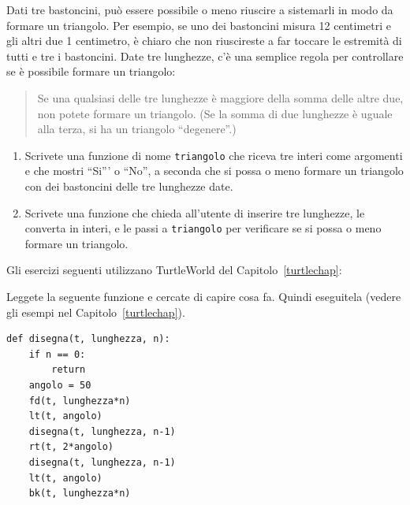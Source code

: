 \documentclass[10pt]{book}
\begin{document}
\vspace{0.2in}
\begin{exercise}

Dati tre bastoncini, può essere possibile o meno riuscire a sistemarli in modo da formare un triangolo. Per esempio, se uno dei bastoncini misura 12 centimetri e gli altri due 1 centimetro, è chiaro che non riuscireste a far toccare le estremità di tutti e tre i bastoncini. Date tre lunghezze, c'è una semplice regola per controllare se è possibile formare un triangolo:

\begin{quotation}
Se una qualsiasi delle tre lunghezze è maggiore della somma delle altre due, non potete formare un triangolo. (Se la somma di due lunghezze è uguale alla terza, si ha un triangolo ``degenere''.)
\end{quotation}

\begin{enumerate}

\item Scrivete una funzione di nome \verb"triangolo" che riceva tre interi come argomenti e che mostri ``Si''' o ``No'', a seconda che si possa o meno formare un triangolo con dei bastoncini delle tre lunghezze date.

\item Scrivete una funzione che chieda all'utente di inserire tre lunghezze, le converta in interi, e le passi a \verb"triangolo" per verificare se si possa o meno formare un triangolo.

\end{enumerate}

\end{exercise}

Gli esercizi seguenti utilizzano TurtleWorld del Capitolo~\ref{turtlechap}:

\vspace{0.2in}
\begin{exercise}

Leggete la seguente funzione e cercate di capire cosa fa. Quindi eseguitela (vedere gli esempi nel Capitolo~\ref{turtlechap}).

\begin{verbatim}
def disegna(t, lunghezza, n):
    if n == 0:
        return
    angolo = 50
    fd(t, lunghezza*n)
    lt(t, angolo)
    disegna(t, lunghezza, n-1)
    rt(t, 2*angolo)
    disegna(t, lunghezza, n-1)
    lt(t, angolo)
    bk(t, lunghezza*n)
\end{verbatim}

\end{exercise}
\end{document}
